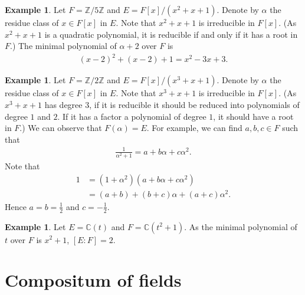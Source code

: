 \documentclass[12pt]{report}
\theoremstyle{plain}
\theoremstyle{remark}
\theoremstyle{definition}
\newtheorem{example}[theorem]{Example}
\newcommand{\Z}{\mathbb{Z}}
\newcommand{\C}{\mathbb{C}}
\begin{document}
\begin{example}
    Let $F=\Z/5\Z$ and $E=F[x]/(x^2+x+1)$. Denote by $\alpha$ the residue class of $x\in F[x]$ in $E$. Note that $x^2+x+1$ is irreducible in $F[x]$. (As $x^2+x+1$ is a quadratic polynomial, it is reducible if and only if it has a root in $F$.) The minimal polynomial of $\alpha+2$ over $F$ is
    \begin{align*}
        (x-2)^2+(x-2)+1 = x^2 - 3x + 3.
    \end{align*}
\end{example}

\begin{example}
    Let $F=\Z/2\Z$ and $E=F[x]/(x^3+x+1)$. Denote by $\alpha$ the residue class of $x\in F[x]$ in $E$. Note that $x^3+x+1$ is irreducible in $F[x]$. (As $x^3+x+1$ has degree $3$, if it is reducible it should be reduced into polynomials of degree $1$ and $2$. If it has a factor a polynomial of degree $1$, it should have a root in $F$.) We can observe that $F(\alpha)=E$. For example, we can find $a,b,c\in F$ such that
    \begin{align*}
        \frac{1}{\alpha^2+1}=a+b\alpha+c\alpha^2.
    \end{align*}
    Note that
    \begin{align*}
        1 &=(1+\alpha^2)(a+b\alpha+c\alpha^2) \\
        &= (a+b)+(b+c)\alpha+(a+c)\alpha^2.
    \end{align*}
    Hence $a=b=\frac{1}{2}$ and $c=-\frac{1}{2}$.
\end{example}

\begin{example}
    Let $E=\C(t)$ and $F=\C(t^2+1)$. As the minimal polynomial of $t$ over $F$ is $x^2+1$, $[E:F]=2$. 
\end{example}


\section{Compositum of fields}
\end{document}
